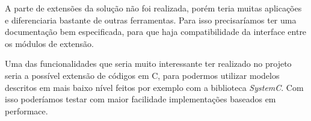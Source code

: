 	A parte de extensões da solução não foi realizada, porém teria muitas aplicações e diferenciaria bastante de outras ferramentas. Para isso precisaríamos ter uma documentação bem especificada, para que haja compatibilidade da interface entre os módulos de extensão.

	Uma das funcionalidades que seria muito interessante ter realizado no projeto seria a possível extensão de códigos em C, para podermos utilizar modelos descritos em mais baixo nível feitos por exemplo com a biblioteca \textit{SystemC}. Com isso poderíamos testar com maior facilidade implementações baseados em performace.

